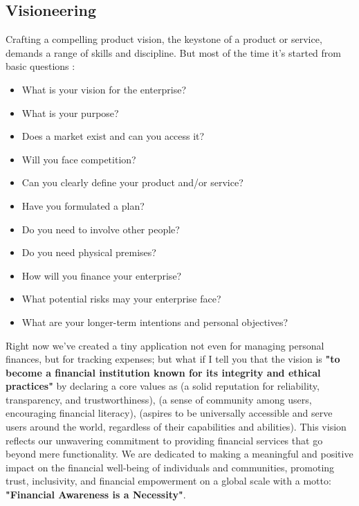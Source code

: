 
\subsection{Visioneering}

Crafting a compelling product vision, the keystone of a product or service, demands a range of skills and discipline.
But most of the time it's started from basic questions \cite{Barr13}:

\begin{itemize}
  \item What is your vision for the enterprise?
  \item What is your purpose?
  \item Does a market exist and can you access it?
  \item Will you face competition?
  \item Can you clearly define your product and/or service?
  \item Have you formulated a plan?
  \item Do you need to involve other people?
  \item Do you need physical premises?
  \item How will you finance your enterprise?
  \item What potential risks may your enterprise face?
  \item What are your longer-term intentions and personal objectives?
\end{itemize}

\noindent Right now we've created a tiny application not even for managing personal finances, but for tracking expenses; 
but what if I tell you that the vision is \textbf{"to become a financial institution known for its integrity and ethical 
practices"} by declaring a core values as  (a solid reputation for reliability, transparency, and 
trustworthiness),  (a sense of community among users, encouraging financial literacy), 
 (aspires to be universally accessible and serve users around the world, regardless of their 
capabilities and abilities). This vision reflects our unwavering commitment to providing financial services that go 
beyond mere functionality. We are dedicated to making a meaningful and positive impact on the financial well-being of
individuals and communities, promoting trust, inclusivity, and financial empowerment on a global scale with a motto: 
\textbf{"Financial Awareness is a Necessity"}.

